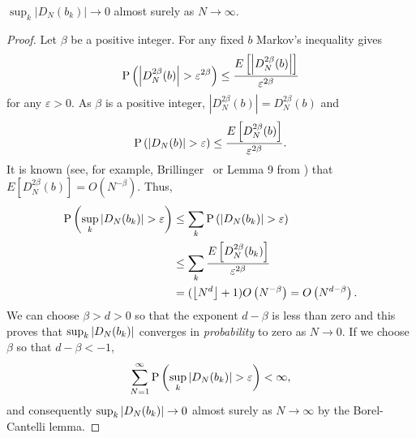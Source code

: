 \documentclass[journal]{../bib/IEEEtran}
\begin{document}
\begin{lemma} \label{lem:DNij->0}
$\sup_{k}\vert D_N(b_k)\vert \rightarrow 0$ almost surely as $N\rightarrow \infty$.
 \end{lemma}
\begin{proof}
Let $\beta$ be a positive integer.  For any fixed $b$ Markov's inequality gives
\[
 \operatorname{P}\left(\left\vert D_N^{2\beta}(b) \right\vert > \varepsilon^{2\beta}\right) \leq \frac{E\left[  \left\vert D_{N}^{2\beta}(b) \right\vert \right]  }{\varepsilon^{2\beta}}
\] 
for any $\varepsilon > 0$. As $\beta$ is a positive integer, $\left|D_N^{2\beta}(b)\right| = D_{N}^{2\beta}(b)$ and
\[
\operatorname{P}\left(\left\vert D_N(b) \right\vert > \varepsilon\right) \leq \frac{E \left[ D_N^{2\beta}(b) \right] }{\varepsilon^{2\beta}}.
\]
It is known (see, for example, Brillinger~\cite{Brillinger1962_moment_bounds_iid} or Lemma 9 from \cite{McKilliamFrequencyEstimationByPhaseUnwrapping2009}) that $E\left[ D_N^{2\beta}(b) \right] = O\left(N^{-\beta}\right)$.  Thus,
 \begin{align*}
 \operatorname{P}\left(  \sup_{k}{\left| D_N(b_k) \right|} >\varepsilon\right)  &\leq \sum_{k } \operatorname{P} \left( {\left| D_N(b_k) \right|} >\varepsilon\right) \\
 &\leq \sum_{k } \frac{E \left[ D_N^{2\beta}(b_k) \right] }{\varepsilon^{2\beta}} \\
&= ({\left\lfloor N^d \right\rfloor} + 1)O\left(N^{-\beta}\right) = O\left(N^{d - \beta}\right).
\end{align*}
We can choose $\beta > d > 0$ so that the exponent $d - \beta$ is less than zero and this proves that $\sup_{k }{\left| D_N(b_k) \right|}$ converges in \emph{probability} to zero as $N \rightarrow 0$. If we choose $\beta$ so that $d - \beta < -1$,
\[
 \sum_{N=1}^{\infty}\operatorname{P}\left(  \sup_{k }{\left| D_N(b_k) \right|} >\varepsilon\right) < \infty,
\]
and consequently $\sup_{k }{\left|  D_N(b_k) \right|} \rightarrow 0$ almost surely as $N\rightarrow\infty$ by the Borel-Cantelli lemma.%
\end{proof}
\end{document}
